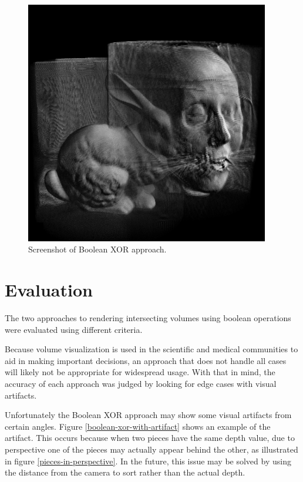 \documentclass{report}
\begin{document}
\begin{figure}
\centering
\includegraphics[width=0.95\textwidth]{boolean-xor-screenshot.png}
\caption{Screenshot of Boolean XOR approach.}
\end{figure}

\chapter{Evaluation}

The two approaches to rendering intersecting volumes using boolean operations
were evaluated using different criteria.

Because volume visualization is used in the scientific and medical communities
to aid in making important decisions, an approach that does not handle all cases
will likely not be appropriate for widespread usage.  With that in mind, the
accuracy of each approach was judged by looking for edge cases with visual
artifacts.

Unfortunately the Boolean XOR approach may show some visual artifacts from
certain angles.  Figure \ref{boolean-xor-with-artifact} shows an example of the
artifact.  This occurs because when two pieces have the same depth value, due to
perspective one of the pieces may actually appear behind the other, as
illustrated in figure \ref{pieces-in-perspective}.  In the future, this issue
may be solved by using the distance from the camera to sort rather than the
actual depth.
\end{document}
